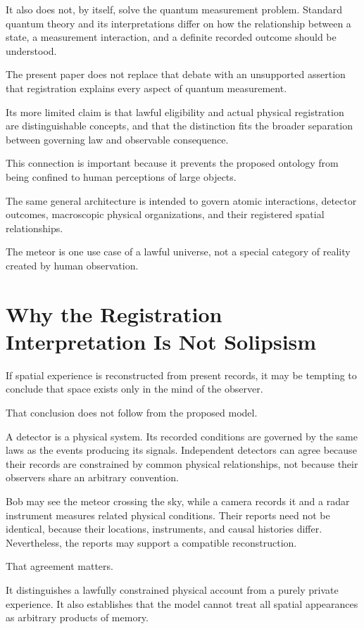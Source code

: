 \documentclass[12pt,onecolumn]{article}
\begin{document}
It also does not, by itself, solve the quantum measurement problem. Standard quantum theory and its interpretations differ on how the relationship between a state, a measurement interaction, and a definite recorded outcome should be understood.

The present paper does not replace that debate with an unsupported assertion that registration explains every aspect of quantum measurement.

Its more limited claim is that lawful eligibility and actual physical registration are distinguishable concepts, and that the distinction fits the broader separation between governing law and observable consequence.

This connection is important because it prevents the proposed ontology from being confined to human perceptions of large objects.

The same general architecture is intended to govern atomic interactions, detector outcomes, macroscopic physical organizations, and their registered spatial relationships.

The meteor is one use case of a lawful universe, not a special category of reality created by human observation.

\section{Why the Registration Interpretation Is Not Solipsism}

If spatial experience is reconstructed from present records, it may be tempting to conclude that space exists only in the mind of the observer.

That conclusion does not follow from the proposed model.

A detector is a physical system. Its recorded conditions are governed by the same laws as the events producing its signals. Independent detectors can agree because their records are constrained by common physical relationships, not because their observers share an arbitrary convention.

Bob may see the meteor crossing the sky, while a camera records it and a radar instrument measures related physical conditions. Their reports need not be identical, because their locations, instruments, and causal histories differ. Nevertheless, the reports may support a compatible reconstruction.

That agreement matters.

It distinguishes a lawfully constrained physical account from a purely private experience. It also establishes that the model cannot treat all spatial appearances as arbitrary products of memory.
\end{document}
